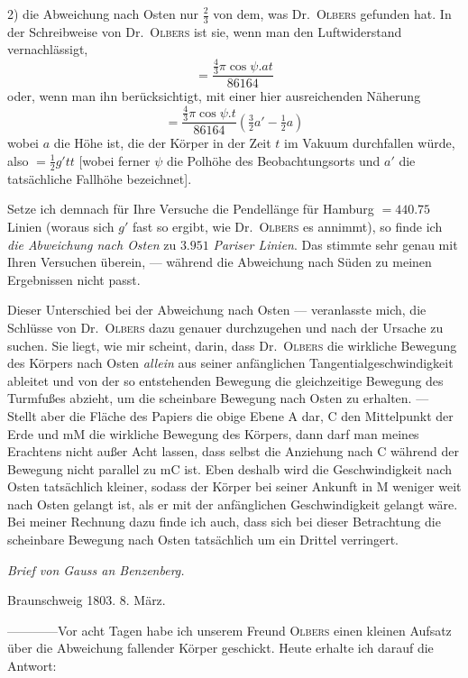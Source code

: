2) die Abweichung nach Osten nur $\tfrac23$ von dem, was Dr.\ \textsc{Olbers} gefunden hat. In der Schreibweise von Dr.\ \textsc{Olbers} ist sie, wenn man den Luftwiderstand vernachlässigt,
\[
=\frac{\tfrac43\pi\cos\psi.at}{86164}
\]
oder, wenn man ihn berücksichtigt, mit einer hier ausreichenden Näherung
\[
=\frac{\tfrac43\pi\cos\psi.t}{86164}(\tfrac32a'-\tfrac12a)
\]
wobei $a$ die Höhe ist, die der Körper in der Zeit $t$ im Vakuum durchfallen würde, also $=\tfrac12g'tt$ [wobei ferner $\psi$ die Polhöhe des Beobachtungsorts und $a'$ die tatsächliche Fallhöhe bezeichnet].

Setze ich demnach für Ihre Versuche die Pendellänge für Hamburg $=440.75$ Linien (woraus sich $g'$ fast so ergibt, wie Dr.\ \textsc{Olbers} es annimmt), so finde ich \textit{die Abweichung nach Osten} zu $3.951$ \textit{Pariser Linien}. Das stimmte sehr genau mit Ihren Versuchen überein, — während die Abweichung nach Süden zu meinen Ergebnissen nicht passt.

\begin{center}\resizebox{!}{58mm}{}\end{center}
Dieser Unterschied bei der Abweichung nach Osten — veranlasste mich, die Schlüsse von Dr.\ \textsc{Olbers} dazu genauer durchzugehen und nach der Ursache zu suchen. Sie liegt, wie mir scheint, darin, dass Dr.\ \textsc{Olbers} die wirkliche Bewegung des Körpers nach Osten \textit{allein} aus seiner anfänglichen Tangentialgeschwindigkeit ableitet und von der so entstehenden Bewegung die gleichzeitige Bewegung des Turmfußes abzieht, um die scheinbare Bewegung nach Osten zu erhalten. — Stellt aber die Fläche des Papiers die obige Ebene $\mathrm{A}$ dar, $\mathrm{C}$ den Mittelpunkt der Erde und $\mathrm{mM}$ die wirkliche Bewegung des Körpers, dann darf man meines Erachtens nicht außer Acht lassen, dass selbst die Anziehung nach $\mathrm{C}$ während der Bewegung nicht parallel zu $\mathrm{mC}$ ist. Eben deshalb wird die Geschwindigkeit nach Osten tatsächlich kleiner, sodass der Körper bei seiner Ankunft in $\mathrm{M}$ weniger weit nach Osten gelangt ist, als er mit der anfänglichen Geschwindigkeit gelangt wäre. Bei meiner Rechnung dazu finde ich auch, dass sich bei dieser Betrachtung die scheinbare Bewegung nach Osten tatsächlich um ein Drittel verringert.

\begin{center}{\large\itshape Brief von Gauss an Benzenberg.}\end{center}
\begin{flushright}Braunschweig 1803. 8. März.\end{flushright}
—\quad—\quad—\quad—\quad Vor acht Tagen habe ich unserem Freund \textsc{Olbers} einen kleinen Aufsatz über die Abweichung fallender Körper geschickt. Heute erhalte ich darauf die Antwort:

